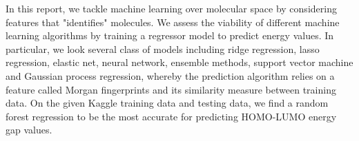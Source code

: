 
In this report, we tackle machine learning over molecular space by considering features that "identifies" molecules. We assess the viability of different machine learning algorithms by training a regressor model to predict energy values. In particular, we look several class of models including ridge regression, lasso regression, elastic net, neural network, ensemble methods, support vector machine and Gaussian process regression, whereby the prediction algorithm relies on a feature called Morgan fingerprints and its similarity measure between training data. On the given Kaggle training data and testing data, we find a random forest regression to be the most accurate for predicting HOMO-LUMO energy gap values.